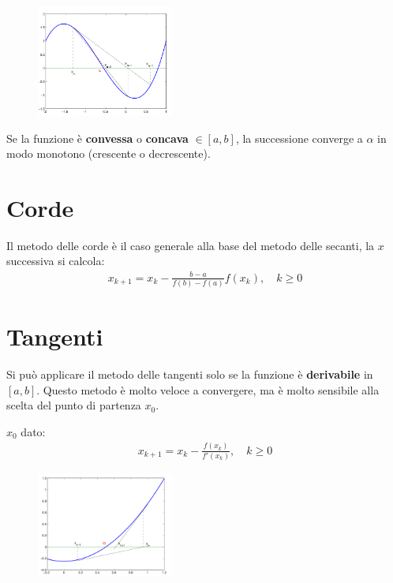 \begin{figure}[h!]
  \centering
  \includegraphics[width=0.4\textwidth]{images/secandi.png}
\end{figure}


Se la funzione \`e \textbf{convessa} o \textbf{concava} $\in [a, b]$, la successione converge a $\alpha$ in modo 
monotono (crescente o decrescente).

\section{Corde}
Il metodo delle corde \`e il caso generale alla base del metodo delle secanti, la $x$ successiva si calcola:
\begin{align}
  x_{k+1} = x_k - \frac{b-a}{f(b)-f(a)} f(x_k), \quad k \geq 0
\end{align}


\section{Tangenti}
Si pu\`o applicare il metodo delle tangenti solo se la funzione \`e \textbf{derivabile} in $[a, b]$.
Questo metodo \`e molto veloce a convergere, ma \`e molto sensibile alla scelta del punto di partenza $x_0$.


$x_0$ dato:
\begin{align}
  x_{k+1} = x_k - \frac{f(x_k)}{f'(x_k)}, \quad k \geq 0
\end{align}


\begin{figure}[h!]
  \centering
  \includegraphics[width=0.4\textwidth]{images/tangenti.png}
\end{figure}



